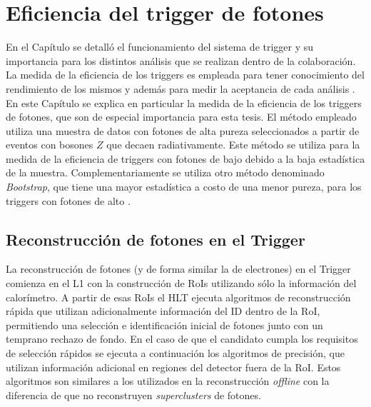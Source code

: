 \chapter{Eficiencia del trigger de fotones}



En el Capítulo  se detalló el funcionamiento del sistema de trigger y su importancia para los distintos análisis que se realizan dentro de la colaboración. La medida de la eficiencia de los triggers es empleada para tener conocimiento del rendimiento de los mismos y además para medir la aceptancia de cada análisis . En este Capítulo se explica en particular la medida de la eficiencia de los triggers de fotones, que son de especial importancia para esta tesis. El método empleado utiliza una muestra de datos con fotones de alta pureza seleccionados a partir de eventos con bosones $Z$ que decaen radiativamente. Este método se utiliza para la medida de la eficiencia de triggers con fotones de bajo \pt debido a la baja estadística de la muestra. Complementariamente se utiliza otro método denominado \textit{Bootstrap}, que tiene una mayor estadística a costo de una menor pureza, para los triggers con fotones de alto \pt. 


\section{Reconstrucción de fotones en el Trigger}

La reconstrucción de fotones \cite{TRIG-2018-05} (y de forma similar la de electrones) en el Trigger comienza en el L1 con la construcción de RoIs utilizando sólo la información del calorímetro. A partir de esas RoIs el HLT ejecuta algoritmos de reconstrucción rápida que utilizan adicionalmente información del ID dentro de la RoI, permitiendo una selección e identificación inicial de fotones junto con un temprano rechazo de fondo. En el caso de que el candidato cumpla los requisitos de selección rápidos se ejecuta a continuación los algoritmos de precisión, que utilizan información adicional en regiones del detector fuera de la RoI. Estos algoritmos son similares a los utilizados en la reconstrucción \textit{offline} con la diferencia de que no reconstruyen \textit{superclusters} de fotones. 

